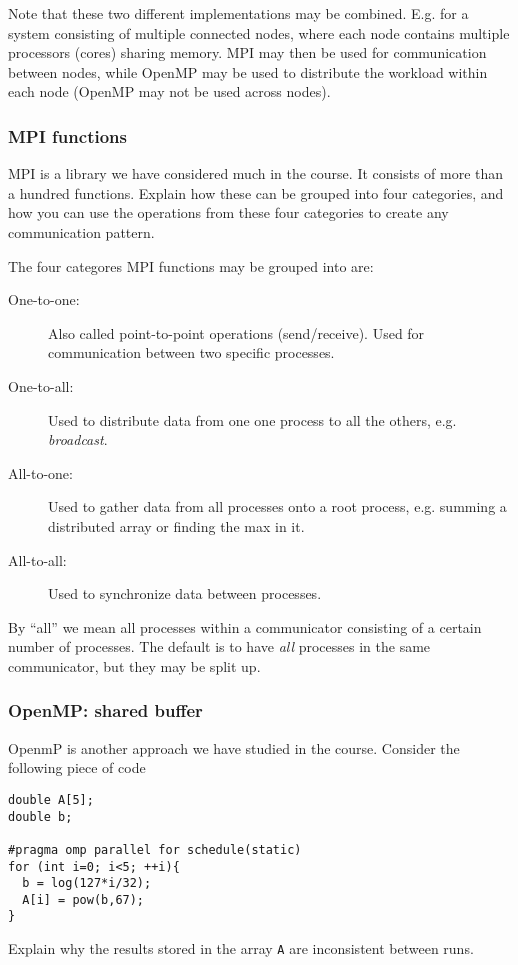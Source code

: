 Note that these two different implementations may be combined. E.g. for a system consisting of multiple connected nodes, where each node contains multiple processors (cores) sharing memory. MPI may then be used for communication between nodes, while OpenMP may be used to distribute the workload within each node (OpenMP may not be used across nodes).

\subsubsection{MPI functions} %
\label{ssub:mpi_functions}


\begin{question}
  MPI is a library we have considered much in the course. It consists of more than a hundred functions. Explain how these can be grouped into four categories, and how you can use the operations from these four categories to create any communication pattern.
\end{question}

The four categores MPI functions may be grouped into are:
\begin{description}
  \item[One-to-one:] Also called point-to-point operations (send/receive). Used for communication between two specific processes.
  \item[One-to-all:] Used to distribute data from one one process to all the others, e.g. \emph{broadcast}.
  \item[All-to-one:] Used to gather data from all processes onto a root process, e.g. summing a distributed array or finding the max in it.
  \item[All-to-all:] Used to synchronize data between processes.
\end{description}
By ``all'' we mean all processes within a communicator consisting of a certain number of processes. The default is to have \emph{all} processes in the same communicator, but they may be split up.

\subsubsection{OpenMP: shared buffer} %
\label{ssub:openmp_shared_buffer}


\begin{question}
  OpenmP is another approach we have studied in the course. Consider the following piece of code
  \begin{lstlisting}
double A[5];
double b;

#pragma omp parallel for schedule(static)
for (int i=0; i<5; ++i){
  b = log(127*i/32);
  A[i] = pow(b,67);
}
  \end{lstlisting}
  Explain why the results stored in the array \texttt{A} are inconsistent between runs.
\end{question}

